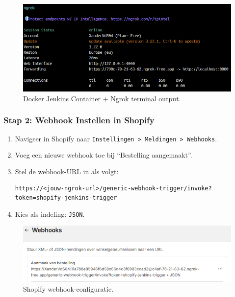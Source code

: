 \vspace{0.5em}
\begin{figure}[H]
    \centering
    \includegraphics[width=1\linewidth]{foto's/ngrokWithJenkins.png}
    \caption{Docker Jenkins Container + Ngrok terminal output.}
    \label{fig:Ngrok-terminal}
\end{figure}

\subsubsection{Stap 2: Webhook Instellen in Shopify}
\begin{enumerate}
    \item Navigeer in Shopify naar \texttt{Instellingen > Meldingen > Webhooks}.
    \item Voeg een nieuwe webhook toe bij ``Bestelling aangemaakt''.
    \item Stel de webhook-URL in als volgt:
    \begin{lstlisting}[language=text]
        https://<jouw-ngrok-url>/generic-webhook-trigger/invoke?token=shopify-jenkins-trigger
    \end{lstlisting}
    \item Kies als indeling: \texttt{JSON}.
\end{enumerate}

\vspace{0.5em}
\begin{figure}[H]
    \centering
    \includegraphics[width=1\linewidth]{foto's/ShopifyWebhookConfig.png}
    \caption{Shopify webhook-configuratie.}
    \label{fig:Shopify-Webhook-configuratie}
\end{figure}

